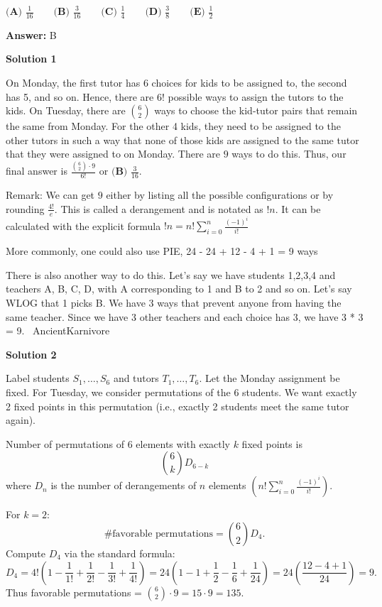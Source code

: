 \begin{enumerate}
 $\textbf{(A) } \frac{1}{16} \qquad\textbf{(B) } \frac{3}{16} \qquad\textbf{(C) }\frac{1}{4}\qquad\textbf{(D) } \frac{3}{8} \qquad\textbf{(E) } \frac{1}{2}$

 \textbf{Answer: }B



\textbf{Solution 1}

On Monday, the first tutor has 6 choices for kids to be assigned to, the second has 5, and so on. Hence, there are $6!$ possible ways to assign the tutors to the kids. On Tuesday, there are $\binom{6}{2}$ ways to choose the kid-tutor pairs that remain the same from Monday. For the other 4 kids, they need to be assigned to the other tutors in such a way that none of those kids are assigned to the same tutor that they were assigned to on Monday. There are $9$ ways to do this. Thus, our final answer is $\frac{\binom{6}{2} \cdot 9}{6!}$ or $\boxed{\textbf{(B) }\frac{3}{16}}$. 

 Remark: We can get $9$ either by listing all the possible configurations or by rounding $\frac{4!}{e}$. This is called a derangement and is notated as $!n$. It can be calculated with the explicit formula $!n = n!\sum _{i=0}^{n}\frac{(-1)^{i}}{i!}$

 More commonly, one could also use PIE, 24 - 24 + 12 - 4 + 1 = 9 ways

 There is also another way to do this. Let's say we have students {1,2,3,4} and teachers {A, B, C, D}, with A corresponding to 1 and B to 2 and so on. Let's say WLOG that 1 picks B. We have 3 ways that prevent anyone from having the same teacher. Since we have 3 other teachers and each choice has 3, we have 3 * 3 = 9. ~AncientKarnivore

 



\textbf{Solution 2}

Label students \( S_1, \ldots, S_6 \) and tutors \( T_1, \ldots, T_6 \). Let the Monday assignment be fixed. For Tuesday, we consider permutations of the 6 students. We want exactly 2 fixed points in this permutation (i.e., exactly 2 students meet the same tutor again).

 Number of permutations of 6 elements with exactly \( k \) fixed points is
 \[\binom{6}{k} D_{6-k}\]where \( D_n \) is the number of derangements of \( n \) elements \( \left( n! \sum_{i=0}^n \frac{(-1)^i}{i!} \right) \).

 For \( k=2 \):
 \[\text{\# favorable permutations} = \binom{6}{2} D_4.\]Compute \( D_4 \) via the standard formula:
 \[D_4 = 4! \left( 1 - \frac{1}{1!} + \frac{1}{2!} - \frac{1}{3!} + \frac{1}{4!} \right) = 24 \left( 1 - 1 + \frac{1}{2} - \frac{1}{6} + \frac{1}{24} \right) = 24 \left( \frac{12 - 4 + 1}{24} \right) = 9.\]Thus favorable permutations = \( \binom{6}{2} \cdot 9 = 15 \cdot 9 = 135 \).


\end{enumerate}
